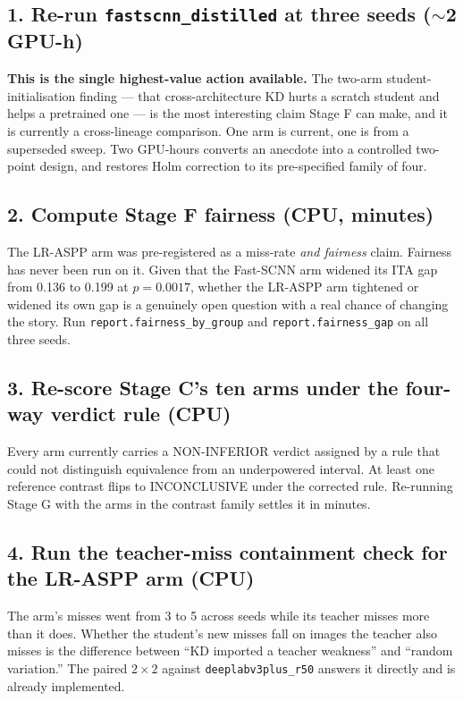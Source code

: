 \documentclass[11pt]{article}
\begin{document}
\subsection*{1. Re-run \texttt{fastscnn\_distilled} at three seeds ($\sim$2 GPU-h)}
\textbf{This is the single highest-value action available.} The two-arm
student-initialisation finding --- that cross-architecture KD hurts a scratch
student and helps a pretrained one --- is the most interesting claim Stage F can
make, and it is currently a cross-lineage comparison. One arm is current, one is
from a superseded sweep. Two GPU-hours converts an anecdote into a controlled
two-point design, and restores Holm correction to its pre-specified family of
four.

\subsection*{2. Compute Stage F fairness (CPU, minutes)}
The LR-ASPP arm was pre-registered as a miss-rate \emph{and fairness} claim.
Fairness has never been run on it. Given that the Fast-SCNN arm widened its ITA
gap from 0.136 to 0.199 at $p=0.0017$, whether the LR-ASPP arm tightened or
widened its own gap is a genuinely open question with a real chance of changing
the story. Run \texttt{report.fairness\_by\_group} and
\texttt{report.fairness\_gap} on all three seeds.

\subsection*{3. Re-score Stage C's ten arms under the four-way verdict rule (CPU)}
Every arm currently carries a NON-INFERIOR verdict assigned by a rule that could
not distinguish equivalence from an underpowered interval. At least one
reference contrast flips to INCONCLUSIVE under the corrected rule. Re-running
Stage G with the arms in the contrast family settles it in minutes.

\subsection*{4. Run the teacher-miss containment check for the LR-ASPP arm (CPU)}
The arm's misses went from 3 to 5 across seeds while its teacher misses more than
it does. Whether the student's new misses fall on images the teacher also misses
is the difference between ``KD imported a teacher weakness'' and ``random
variation.'' The paired $2\times2$ against \texttt{deeplabv3plus\_r50} answers it
directly and is already implemented.
\end{document}
